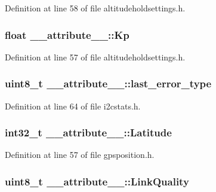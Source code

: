 \-Definition at line 58 of file altitudeholdsettings.\-h.

\hypertarget{struct____attribute_____a514928f27484841c4cef0ff7051b234a}{
\subsubsection[{\-Kp}]{\setlength{\rightskip}{0pt plus 5cm}float {\bf \-\_\-\-\_\-attribute\-\_\-\-\_\-\-::\-Kp}}}\label{struct____attribute_____a514928f27484841c4cef0ff7051b234a}


\-Definition at line 57 of file altitudeholdsettings.\-h.

\hypertarget{struct____attribute_____a7b0de2ce3a07a118427206ffbcfa624f}{
\subsubsection[{last\-\_\-error\-\_\-type}]{\setlength{\rightskip}{0pt plus 5cm}uint8\-\_\-t {\bf \-\_\-\-\_\-attribute\-\_\-\-\_\-\-::last\-\_\-error\-\_\-type}}}\label{struct____attribute_____a7b0de2ce3a07a118427206ffbcfa624f}


\-Definition at line 64 of file i2cstats.\-h.

\hypertarget{struct____attribute_____aef9cee564e5ce4cb3d5e9bc5041b20fa}{
\subsubsection[{\-Latitude}]{\setlength{\rightskip}{0pt plus 5cm}int32\-\_\-t {\bf \-\_\-\-\_\-attribute\-\_\-\-\_\-\-::\-Latitude}}}\label{struct____attribute_____aef9cee564e5ce4cb3d5e9bc5041b20fa}


\-Definition at line 57 of file gpsposition.\-h.

\hypertarget{struct____attribute_____a7742e3525fe7e863e9b64efabc5638f7}{
\subsubsection[{\-Link\-Quality}]{\setlength{\rightskip}{0pt plus 5cm}uint8\-\_\-t {\bf \-\_\-\-\_\-attribute\-\_\-\-\_\-\-::\-Link\-Quality}}}\label{struct____attribute_____a7742e3525fe7e863e9b64efabc5638f7}


